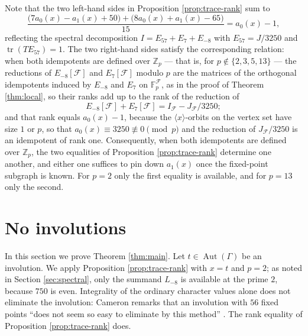 \documentclass[11pt]{article}
\theoremstyle{plain}
\theoremstyle{remark}
\newcommand{\Aut}{\operatorname{Aut}}
\newcommand{\tr}{\operatorname{tr}}
\newcommand{\Zp}{\mathbb Z_p}
\newcommand{\Fp}{\mathbb F_p}
\begin{document}
Note that the two left-hand sides in Proposition \ref{prop:trace-rank} sum to
\[
 \frac{\bigl(7a_0(x)-a_1(x)+50\bigr)+\bigl(8a_0(x)+a_1(x)-65\bigr)}{15}=a_0(x)-1,
\]
reflecting the spectral decomposition $I=E_{57}+E_{7}+E_{-8}$ with $E_{57}=J/3250$ and $\tr(TE_{57})=1$.
The two right-hand sides satisfy the corresponding relation: when both idempotents are defined over $\Zp$ --- that is,
for $p\notin\{2,3,5,13\}$
--- the reductions of $E_{-8}[\mathcal F]$ and $E_{7}[\mathcal F]$ modulo $p$ are the matrices of the orthogonal idempotents induced by $E_{-8}$ and $E_{7}$ on $\Fp^{\mathcal F}$,
as in the proof of Theorem \ref{thm:local}, so their ranks add up to the rank of the reduction of
\[
 E_{-8}[\mathcal F]+E_{7}[\mathcal F]=I_{\mathcal F}-J_{\mathcal F}/3250;
\]
and that rank equals $a_0(x)-1$, because the $\langle x\rangle$-orbits on the vertex set have size $1$ or $p$,
so that $a_0(x)\equiv 3250\not\equiv 0\pmod p$ and the reduction of $J_{\mathcal F}/3250$ is an idempotent of rank one.
Consequently, when both idempotents are defined over $\Zp$,
the two equalities of Proposition \ref{prop:trace-rank} determine one another,
and either one suffices to pin down $a_1(x)$ once the fixed-point subgraph is known.
For $p=2$ only the first equality is available, and for $p=13$ only the second.

\section{No involutions}\label{sec:involutions}

In this section we prove Theorem \ref{thm:main}.
Let $t\in\Aut(\Gamma)$ be an involution.
We apply Proposition \ref{prop:trace-rank} with $x=t$ and $p=2$; as noted in Section \ref{sec:spectral},
only the summand $L_{-8}$ is available at the prime $2$, because $750$ is even.
Integrality of the ordinary character values alone does not eliminate the involution:
Cameron remarks that an involution with $56$ fixed points ``does not seem so easy to eliminate by this method'' \cite[remark following Theorem 3.13]{Cameron}.
The rank equality of Proposition \ref{prop:trace-rank} does.
\end{document}
